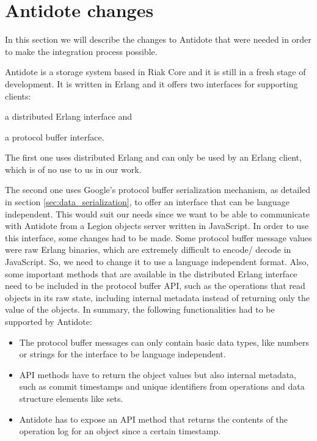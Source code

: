\section{Antidote changes}
\label{sec:antidote_changes}
In this section we will describe the changes to Antidote that were needed in order to make the integration process possible.\par
	Antidote is a storage system based in Riak Core and it is still in a fresh stage of development. It is written in Erlang and it offers two interfaces for supporting clients: 
\begin{enumerate*}[(i)]
\item a distributed Erlang interface and 
\item a protocol buffer interface.
\end{enumerate*}
\par
	The first one uses distributed Erlang and can only be used by an Erlang client, which is of no use to us in our work.\par
	The second one uses Google's protocol buffer serialization mechanism, as detailed in section \ref{sec:data_serialization}, to offer an interface that can be language independent. This would suit our needs since we want to be able to communicate with Antidote from a Legion objects server written in JavaScript. In order to use this interface, some changes had to be made. Some protocol buffer message values were raw Erlang binaries, which are extremely difficult to encode/ decode in JavaScript. So, we need to change it to use a language independent format. Also, some important methods that are available in the distributed Erlang interface need to be included in the protocol buffer API, such as the operations that read objects in its raw state, including internal metadata instead of returning only the value of the objects. In summary, the following functionalities had to be supported by Antidote:
	\begin{itemize}
	\item The protocol buffer messages can only contain basic data types, like numbers or strings for the interface to be language independent.
	\item API methods have to return the object values but also internal metadata, such as commit timestamps and unique identifiers from operations and data structure elements like sets.
	\item Antidote has to expose an API method that returns the contents of the operation log for an object since a certain timestamp.
	\end{itemize}
